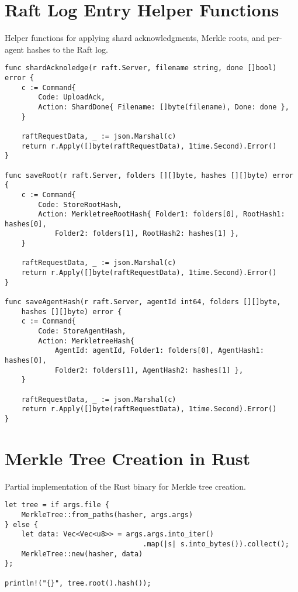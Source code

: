 \section{Raft Log Entry Helper Functions} \label{code:raft-method-to-add-log}

\begin{listing}[H]
\caption{Helper functions for applying shard acknowledgments, Merkle roots, and per-agent hashes to the Raft log.}
\begin{verbatim}
func shardAcknoledge(r raft.Server, filename string, done []bool) error {
    c := Command{
        Code: UploadAck,
        Action: ShardDone{ Filename: []byte(filename), Done: done },
    }

    raftRequestData, _ := json.Marshal(c)
    return r.Apply([]byte(raftRequestData), 1time.Second).Error()
}

func saveRoot(r raft.Server, folders [][]byte, hashes [][]byte) error {
    c := Command{
        Code: StoreRootHash,
        Action: MerkletreeRootHash{ Folder1: folders[0], RootHash1: hashes[0],
            Folder2: folders[1], RootHash2: hashes[1] },
    }

    raftRequestData, _ := json.Marshal(c)
    return r.Apply([]byte(raftRequestData), 1time.Second).Error()
}

func saveAgentHash(r raft.Server, agentId int64, folders [][]byte,
    hashes [][]byte) error {
    c := Command{
        Code: StoreAgentHash,
        Action: MerkletreeHash{
            AgentId: agentId, Folder1: folders[0], AgentHash1: hashes[0],
            Folder2: folders[1], AgentHash2: hashes[1] },
    }

    raftRequestData, _ := json.Marshal(c)
    return r.Apply([]byte(raftRequestData), 1time.Second).Error()
}
\end{verbatim}
\end{listing}



\section{Merkle Tree Creation in Rust} \label{code:partial-mt-rs-1}

\begin{listing}[H]
\caption{Partial implementation of the Rust binary for Merkle tree creation.}
\begin{verbatim}
let tree = if args.file {
    MerkleTree::from_paths(hasher, args.args)
} else {
    let data: Vec<Vec<u8>> = args.args.into_iter()
                                 .map(|s| s.into_bytes()).collect();
    MerkleTree::new(hasher, data)
};

println!("{}", tree.root().hash());
\end{verbatim}
\end{listing}

